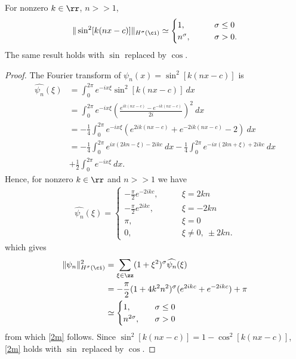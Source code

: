 		\begin{proposition}
			\label{2n}
			For nonzero $k \in \rr$, $n >>1$,
			\begin{equation}
				\label{2m}
				\begin{split}
					\|\sin^2[k(nx-c)] \|_{H^\sigma(\ci)} \simeq
					\begin{cases}
					1, \qquad & \sigma \le 0
					\\
					n^\sigma,\qquad &\sigma > 0.
				\end{cases}
				\end{split}
			\end{equation}
			The same result holds with $\sin$ replaced by $\cos$.
		\end{proposition}
		\begin{proof} The Fourier transform of $\psi_n(x) = \sin^2[k(nx-c)]$
		is
		\begin{equation*}
			\begin{split}
				\widehat{\psi_n}(\xi) 
				& = \int_0^{2\pi} e^{-ix \xi} \sin^2[k(nx-c)] \ dx
				\\
				& = \int_0^{2\pi} e^{-ix \xi} \left( \frac{e^{ik(nx-c)} -
				e^{-ik(nx-c)}}{2i} \right)^2 \ dx
				\\
				& = -\frac{1}{4} \int_0^{2\pi} e^{-ix \xi} (e^{2ik(nx-c)} +
				e^{-2ik(nx-c)} -2) \ dx
				\\
				& = -\frac{1}{4} \int_0^{2\pi} e^{ix(2kn - \xi) - 2ikc} \
				dx - \frac{1}{4} \int_0^{2\pi} e^{-ix(2kn + \xi) + 2ikc} \ dx
				\\
				& + \frac{1}{2} \int_0^{2\pi} e^{-ix \xi} \ dx.
			\end{split}
		\end{equation*}
	Hence, for nonzero $k \in \rr$ and $n >>1$ we have
	\begin{equation*}
		\begin{split}
			\widehat{\psi_n}(\xi) = 
			\begin{cases}
				-\frac{\pi}{2}e^{-2ikc}, \qquad & \xi=2kn
				\\
				-\frac{\pi}{2}e^{2ikc}, \qquad & \xi = -2kn
				\\
				\pi, \qquad & \xi = 0
				\\
				0, \qquad & \xi \neq 0, \ \pm 2kn.
			\end{cases}
		\end{split}
	\end{equation*}
	which gives
	\begin{equation*}
		\begin{split}
			\|\psi_n\|_{H^\sigma(\ci)}^2 
			& = \sum_{\xi \in \zz} (1+ \xi^2)^\sigma \widehat{\psi_n}(\xi)
			\\
			& = -\frac{\pi}{2}(1+4k^2n^2)^\sigma (e^{2ikc} + e^{-2ikc}) +
			\pi
			\\
			& \simeq 
			\begin{cases}
				1,  \qquad & \sigma \le 0 
				\\
				n^{2 \sigma}, &  \sigma > 0
			\end{cases}
		\end{split}
	\end{equation*}
	from which \eqref{2m} follows. Since $\sin^2[k(nx-c)] = 1-
	\cos^2[k(nx-c)]$, \eqref{2m} holds with $\sin$ replaced by
	$\cos$. 
\end{proof}
